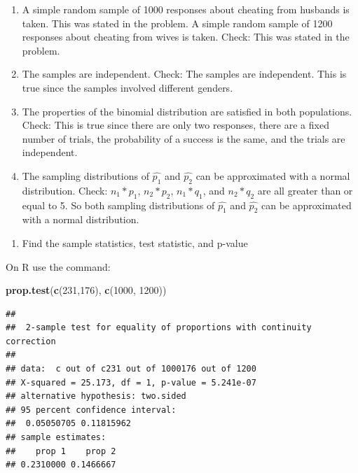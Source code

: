 \documentclass[
]{book}
\newenvironment{Shaded}{\begin{snugshade}}{\end{snugshade}}
\newcommand{\DecValTok}[1]{\textcolor[rgb]{0.00,0.00,0.81}{#1}}
\newcommand{\KeywordTok}[1]{\textcolor[rgb]{0.13,0.29,0.53}{\textbf{#1}}}
\newcommand{\NormalTok}[1]{#1}
\providecommand{\tightlist}{%
  \setlength{\itemsep}{0pt}\setlength{\parskip}{0pt}}
\begin{document}
\begin{enumerate}
\def\labelenumi{\alph{enumi}.}
\item
  A simple random sample of 1000 responses about cheating from husbands is taken. This was stated in the problem. A simple random sample of 1200 responses about cheating from wives is taken. Check: This was stated in the problem.
\item
  The samples are independent. Check: The samples are independent. This is true since the samples involved different genders.
\item
  The properties of the binomial distribution are satisfied in both populations. Check: This is true since there are only two responses, there are a fixed number of trials, the probability of a success is the same, and the trials are independent.
\item
  The sampling distributions of \(\hat{p_1}\) and \(\hat{p_2}\) can be approximated with a normal distribution. Check: \(n_1*p_1\), \(n_2*p_2\), \(n_1*q_1\), and \(n_2*q_2\) are all greater than or equal to 5. So both sampling distributions of \(\hat{p_1}\) and \(\hat{p_2}\) can be approximated with a normal distribution.
\end{enumerate}

\begin{enumerate}
\def\labelenumi{\arabic{enumi}.}
\setcounter{enumi}{3}
\tightlist
\item
  Find the sample statistics, test statistic, and p-value
\end{enumerate}

On R use the command:

\begin{Shaded}
\begin{Highlighting}[]
\KeywordTok{prop.test}\NormalTok{(}\KeywordTok{c}\NormalTok{(}\DecValTok{231}\NormalTok{,}\DecValTok{176}\NormalTok{), }\KeywordTok{c}\NormalTok{(}\DecValTok{1000}\NormalTok{, }\DecValTok{1200}\NormalTok{))}
\end{Highlighting}
\end{Shaded}

\begin{verbatim}
## 
##  2-sample test for equality of proportions with continuity correction
## 
## data:  c out of c231 out of 1000176 out of 1200
## X-squared = 25.173, df = 1, p-value = 5.241e-07
## alternative hypothesis: two.sided
## 95 percent confidence interval:
##  0.05050705 0.11815962
## sample estimates:
##    prop 1    prop 2 
## 0.2310000 0.1466667
\end{verbatim}
\end{document}
